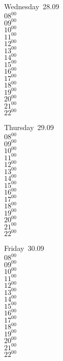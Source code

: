\documentclass[11pt,a4paper]{book}\usepackage[]{graphicx}\usepackage[]{color}
\begin{document}
\begin{weekdaybox}
  Wednesday~28.09\\
  { 
  \vfill
  $08^{00}$\\
$09^{00}$\\
$10^{00}$\\
$11^{00}$\\
$12^{00}$\\
$13^{00}$\\
$14^{00}$\\
$15^{00}$\\
$16^{00}$\\
$17^{00}$\\
$18^{00}$\\
$19^{00}$\\
$20^{00}$\\
$21^{00}$\\
$22^{00}$\\
  }
\end{weekdaybox}
\clearpage
\begin{headerbox}
\end{headerbox}
\begin{weekdaybox}
  Thursday~29.09\\
  { 
  \vfill
  $08^{00}$\\
$09^{00}$\\
$10^{00}$\\
$11^{00}$\\
$12^{00}$\\
$13^{00}$\\
$14^{00}$\\
$15^{00}$\\
$16^{00}$\\
$17^{00}$\\
$18^{00}$\\
$19^{00}$\\
$20^{00}$\\
$21^{00}$\\
$22^{00}$\\
  }
\end{weekdaybox} 
\begin{weekdaybox}
  Friday~30.09\\
  { 
  \vfill
  $08^{00}$\\
$09^{00}$\\
$10^{00}$\\
$11^{00}$\\
$12^{00}$\\
$13^{00}$\\
$14^{00}$\\
$15^{00}$\\
$16^{00}$\\
$17^{00}$\\
$18^{00}$\\
$19^{00}$\\
$20^{00}$\\
$21^{00}$\\
$22^{00}$\\
  }
\end{weekdaybox}
\end{document}

